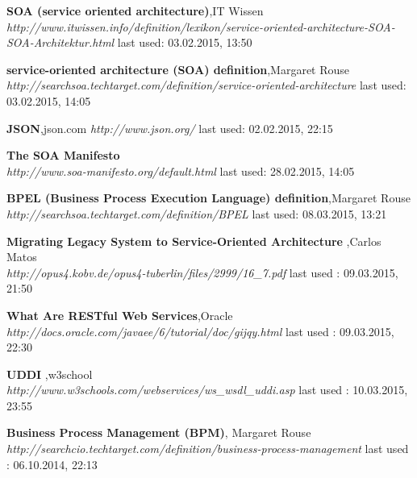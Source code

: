 \documentclass[12pt]{article}
\begin{document}
\begin{thebibliography}{56}
     
   \textbf{SOA (service oriented architecture)},IT Wissen \\
  \textit{http://www.itwissen.info/definition/lexikon/service-oriented-architecture-SOA-SOA-Architektur.html}
  \newline last used: 03.02.2015, 13:50
     
   \textbf{service-oriented architecture (SOA) definition},Margaret Rouse \\
  \textit{http://searchsoa.techtarget.com/definition/service-oriented-architecture}
  \newline last used: 03.02.2015, 14:05

  \textbf{JSON},json.com
  \textit{http://www.json.org/}
  \newline last used: 02.02.2015, 22:15

 
   \textbf{The SOA Manifesto} \\
  \textit{http://www.soa-manifesto.org/default.html}
  \newline last used: 28.02.2015, 14:05


   \textbf{BPEL (Business Process Execution Language) definition},Margaret Rouse \\
  \textit{http://searchsoa.techtarget.com/definition/BPEL}
  \newline last used: 08.03.2015, 13:21

    \textbf{Migrating Legacy System to Service-Oriented Architecture },Carlos Matos\\
    \textit{http://opus4.kobv.de/opus4-tuberlin/files/2999/16_7.pdf}
    \newline last used : 09.03.2015, 21:50

    \textbf{What Are RESTful Web Services},Oracle
    \textit{http://docs.oracle.com/javaee/6/tutorial/doc/gijqy.html}
    \newline last used : 09.03.2015, 22:30

    \textbf{UDDI },w3school\\
    \textit{http://www.w3schools.com/webservices/ws_wsdl_uddi.asp}
    \newline last used : 10.03.2015, 23:55

   \textbf{Business Process Management (BPM)}, Margaret Rouse\\
  \emph{http://searchcio.techtarget.com/definition/business-process-management}
  \newline last used : 06.10.2014, 22:13
  


\end{thebibliography}
\end{document}
